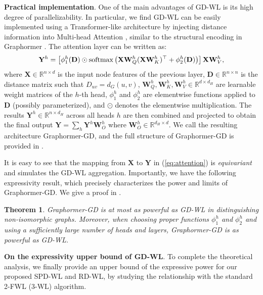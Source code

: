 \documentclass{article} %
\let\cref\crtcref
\newtheorem{theorem}{Theorem}[section]
\begin{document}
\textbf{Practical implementation}. One of the main advantages of GD-WL is its high degree of parallelizability. In particular, we find GD-WL can be easily implemented using a Transformer-like architecture by injecting distance information into Multi-head Attention \citep{vaswani2017attention}, similar to the structural encoding in Graphormer \citep{ying2021transformers}. The attention layer can be written as:
\begin{equation}
\setlength{\abovedisplayskip}{5pt}
\setlength{\belowdisplayskip}{5pt}
\label{eq:attention}
    \mathbf Y^h=\left[\phi_1^h(\mathbf D)\odot \operatorname{softmax}\left(\mathbf X\mathbf W^h_Q(\mathbf X\mathbf W^h_K)^\top+\mathbf \phi_2^h(\mathbf D)\right)\right]\mathbf X\mathbf W^h_V,
\end{equation}
where $\mathbf X\in\mathbb R^{n\times d}$ is the input node features of the previous layer, $\mathbf D\in\mathbb R^{n\times n}$ is the distance matrix such that $D_{uv}=d_G(u,v)$, $\mathbf W^h_Q,\mathbf W^h_K,\mathbf W^h_V\in\mathbb R^{d\times d_H}$ are learnable weight matrices of the $h$-th head, $\phi_1^h$ and $\phi_2^h$ are elementwise functions applied to $\mathbf D$ (possibly parameterized), and $\odot$ denotes the elementwise multiplication. The results $\mathbf Y^h\in\mathbb R^{n\times d_H}$ across all heads $h$ are then combined and projected to obtain the final output $\mathbf Y=\sum_h \mathbf Y^h\mathbf W_O^h$ where $\mathbf W_O^h\in\mathbb R^{d_H\times d}$. We call the resulting architecture Graphormer-GD, and the full structure of Graphormer-GD is provided in \cref{sec:transformer}.

It is easy to see that the mapping from $\mathbf X$ to $\mathbf Y$ in (\ref{eq:attention}) is \emph{equivariant} and simulates the GD-WL aggregation. Importantly, we have the following expressivity result, which precisely characterizes the power and limits of Graphormer-GD. We give a proof in \cref{sec:transformer}.
\begin{theorem}
\label{thm:Graphormer-GD-gdwl}
Graphormer-GD is at most as powerful as GD-WL in distinguishing non-isomorphic graphs. Moreover, when choosing proper functions $\phi_1^h$ and $\phi_2^h$ and using a sufficiently large number of heads and layers, Graphormer-GD is as powerful as GD-WL.
\end{theorem}

\textbf{On the expressivity upper bound of GD-WL}. To complete the theoretical analysis, we finally provide an upper bound of the expressive power for our proposed SPD-WL and RD-WL, by studying the relationship with the standard 2-FWL (3-WL) algorithm.
\end{document}
